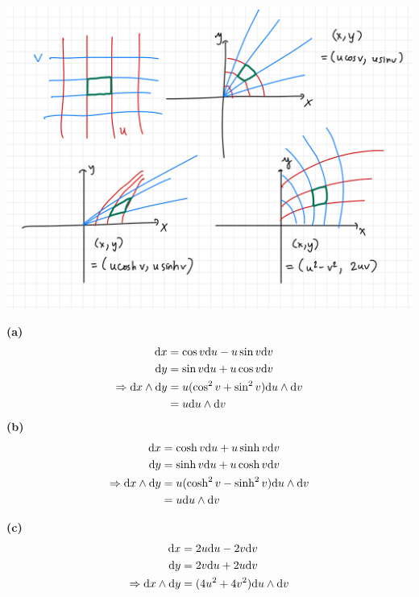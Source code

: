 \documentclass[a4paper, 12pt]{article}
\begin{document}
\begin{solution}
\mbox{}
    \begin{center}
        \includegraphics[width=15cm]{./figures/8.10.jpeg}
    \end{center}
    \textbf{(a)} \begin{align*}
        \mathrm{d} x &= \cos v \mathrm{d} u - u \sin v \mathrm{d} v \\
        \mathrm{d} y &= \sin v \mathrm{d} u + u \cos v \mathrm{d} v \\
        \Rightarrow \mathrm{d} x \wedge \mathrm{d} y &= u(\cos^2 v + \sin^2 v) \mathrm{d} u \wedge \mathrm{d} v \\
        &= u \mathrm{d} u \wedge \mathrm{d} v \\
    \end{align*}
    \textbf{(b)} \begin{align*}
    \mathrm{d} x &= \cosh v \mathrm{d} u + u \sinh v \mathrm{d} v \\
    \mathrm{d} y &= \sinh v \mathrm{d} u + u \cosh v \mathrm{d} v \\
    \Rightarrow \mathrm{d} x \wedge \mathrm{d} y &= u(\cosh^2 v - \sinh^2 v) \mathrm{d} u \wedge \mathrm{d} v \\
    &= u \mathrm{d} u \wedge \mathrm{d} v
    \end{align*}

    \textbf{(c)} \begin{align*}
    \mathrm{d} x &= 2u \mathrm{d} u - 2v \mathrm{d} v \\
    \mathrm{d} y &= 2v \mathrm{d} u + 2u \mathrm{d} v \\
    \Rightarrow \mathrm{d} x \wedge \mathrm{d} y &= (4u^2 + 4v^2) \mathrm{d} u \wedge \mathrm{d} v
    \end{align*}
\end{solution}
\end{document}
